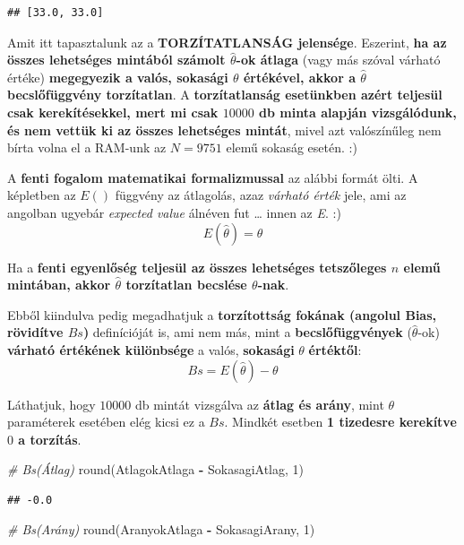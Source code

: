 \documentclass[
]{book}
\newenvironment{Shaded}{\begin{snugshade}}{\end{snugshade}}
\newcommand{\BuiltInTok}[1]{#1}
\newcommand{\CommentTok}[1]{\textcolor[rgb]{0.56,0.35,0.01}{\textit{#1}}}
\newcommand{\DecValTok}[1]{\textcolor[rgb]{0.00,0.00,0.81}{#1}}
\newcommand{\NormalTok}[1]{#1}
\newcommand{\OperatorTok}[1]{\textcolor[rgb]{0.81,0.36,0.00}{\textbf{#1}}}
\begin{document}
\begin{verbatim}
## [33.0, 33.0]
\end{verbatim}

Amit itt tapasztalunk az a \textbf{TORZÍTATLANSÁG jelensége}. Eszerint, \textbf{ha az összes lehetséges mintából számolt \(\hat{\theta}\)-ok átlaga} (vagy más szóval várható értéke) \textbf{megegyezik a valós, sokasági \(\theta\) értékével, akkor a \(\hat{\theta}\) becslőfüggvény torzítatlan}. A \textbf{torzítatlanság esetünkben azért teljesül csak kerekítésekkel, mert mi csak \(10000\) db minta alapján vizsgálódunk, és nem vettük ki az összes lehetséges mintát}, mivel azt valószínűleg nem bírta volna el a RAM-unk az \(N=9751\) elemű sokaság esetén. :)

A \textbf{fenti fogalom matematikai formalizmussal} az alábbi formát ölti. A képletben az \(E()\) függvény az átlagolás, azaz \emph{várható érték} jele, ami az angolban ugyebár \emph{expected value} álnéven fut \ldots{} innen az \emph{E}. :) \[E(\hat{\theta})=\theta\]

Ha a \textbf{fenti egyenlőség teljesül az összes lehetséges tetszőleges \(n\) elemű mintában, akkor \(\hat{\theta}\) torzítatlan becslése \(\theta\)-nak}.

Ebből kiindulva pedig megadhatjuk a \textbf{torzítottság fokának (angolul Bias, rövidítve \(Bs\))} definícióját is, ami nem más, mint a \textbf{becslőfüggvények} (\(\hat{\theta}\)-ok) \textbf{várható értékének különbsége} a valós, \textbf{sokasági} \(\theta\) \textbf{értéktől}:\[Bs=E(\hat{\theta})-\theta\]

Láthatjuk, hogy \(10000\) db mintát vizsgálva az \textbf{átlag és arány}, mint \(\theta\) paraméterek esetében elég kicsi ez a \(Bs\). Mindkét esetben \textbf{1 tizedesre kerekítve \(0\) a torzítás}.

\begin{Shaded}
\begin{Highlighting}[]
\CommentTok{\# Bs(Átlag)}
\BuiltInTok{round}\NormalTok{(AtlagokAtlaga }\OperatorTok{{-}}\NormalTok{ SokasagiAtlag, }\DecValTok{1}\NormalTok{)}
\end{Highlighting}
\end{Shaded}

\begin{verbatim}
## -0.0
\end{verbatim}

\begin{Shaded}
\begin{Highlighting}[]
\CommentTok{\# Bs(Arány)}
\BuiltInTok{round}\NormalTok{(AranyokAtlaga }\OperatorTok{{-}}\NormalTok{ SokasagiArany, }\DecValTok{1}\NormalTok{)}
\end{Highlighting}
\end{Shaded}
\end{document}
